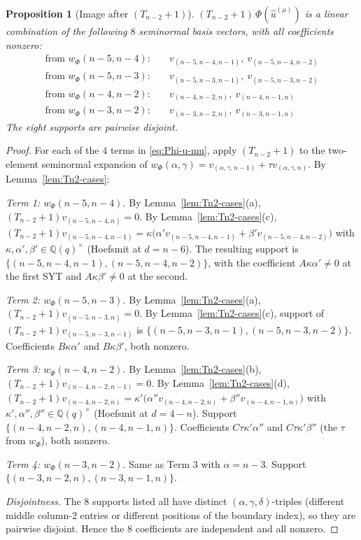 \documentclass[11pt]{article}
\newtheorem{proposition}[theorem]{Proposition}
\theoremstyle{definition}
\begin{document}
\begin{proposition}[Image after $(T_{n-2}{+}1)$]\label{prop:Tn2-image}
$(T_{n-2}{+}1)\,\Phi(\hat u^{(\mu)})$ is a linear combination of
the following $8$ seminormal basis vectors, with all coefficients
nonzero:
\begin{align*}
\text{from }w_\Phi(n{-}5,n{-}4):\quad &
v_{(n-5,n-4,n-1)},\ v_{(n-5,n-4,n-2)}\\
\text{from }w_\Phi(n{-}5,n{-}3):\quad &
v_{(n-5,n-3,n-1)},\ v_{(n-5,n-3,n-2)}\\
\text{from }w_\Phi(n{-}4,n{-}2):\quad &
v_{(n-4,n-2,n)},\ v_{(n-4,n-1,n)}\\
\text{from }w_\Phi(n{-}3,n{-}2):\quad &
v_{(n-3,n-2,n)},\ v_{(n-3,n-1,n)}
\end{align*}
The eight supports are pairwise disjoint.
\end{proposition}

\begin{proof}
For each of the $4$ terms in \eqref{eq:Phi-u-mu}, apply
$(T_{n-2}{+}1)$ to the two-element seminormal expansion of
$w_\Phi(\alpha,\gamma)=v_{(\alpha,\gamma,n-1)}+\tau
v_{(\alpha,\gamma,n)}$.  By Lemma~\ref{lem:Tn2-cases}:

\emph{Term 1: $w_\Phi(n{-}5,n{-}4)$.}  By Lemma~\ref{lem:Tn2-cases}(a),
$(T_{n-2}{+}1)v_{(n-5,n-4,n)}=0$.  By Lemma~\ref{lem:Tn2-cases}(c),
$(T_{n-2}{+}1)v_{(n-5,n-4,n-1)}=\kappa\big(\alpha' v_{(n-5,n-4,n-1)}
+\beta' v_{(n-5,n-4,n-2)}\big)$ with
$\kappa,\alpha',\beta'\in\mathbb{Q}(q)^\times$ (Hoefsmit at $d=n-6$).
The resulting support is $\{(n-5,n-4,n-1),(n-5,n-4,n-2)\}$, with
the coefficient $A\kappa\alpha'\ne 0$ at the first SYT and
$A\kappa\beta'\ne 0$ at the second.

\emph{Term 2: $w_\Phi(n{-}5,n{-}3)$.}  By Lemma~\ref{lem:Tn2-cases}(a),
$(T_{n-2}{+}1)v_{(n-5,n-3,n)}=0$.  By Lemma~\ref{lem:Tn2-cases}(c),
support of $(T_{n-2}{+}1)v_{(n-5,n-3,n-1)}$ is
$\{(n-5,n-3,n-1),(n-5,n-3,n-2)\}$.  Coefficients $B\kappa\alpha'$
and $B\kappa\beta'$, both nonzero.

\emph{Term 3: $w_\Phi(n{-}4,n{-}2)$.}  By Lemma~\ref{lem:Tn2-cases}(b),
$(T_{n-2}{+}1)v_{(n-4,n-2,n-1)}=0$.  By Lemma~\ref{lem:Tn2-cases}(d),
$(T_{n-2}{+}1)v_{(n-4,n-2,n)}=\kappa'\big(\alpha'' v_{(n-4,n-2,n)}
+\beta'' v_{(n-4,n-1,n)}\big)$ with
$\kappa',\alpha'',\beta''\in\mathbb{Q}(q)^\times$ (Hoefsmit at
$d=4-n$).  Support $\{(n-4,n-2,n),(n-4,n-1,n)\}$.  Coefficients
$C\tau\kappa'\alpha''$ and $C\tau\kappa'\beta''$ (the $\tau$
from $w_\Phi$), both nonzero.

\emph{Term 4: $w_\Phi(n{-}3,n{-}2)$.}  Same as Term 3 with
$\alpha=n-3$.  Support $\{(n-3,n-2,n),(n-3,n-1,n)\}$.

\emph{Disjointness.}  The $8$ supports listed all have distinct
$(\alpha,\gamma,\delta)$-triples (different middle column-$2$
entries or different positions of the boundary index), so they
are pairwise disjoint.  Hence the $8$ coefficients are
independent and all nonzero.
\end{proof}
\end{document}
